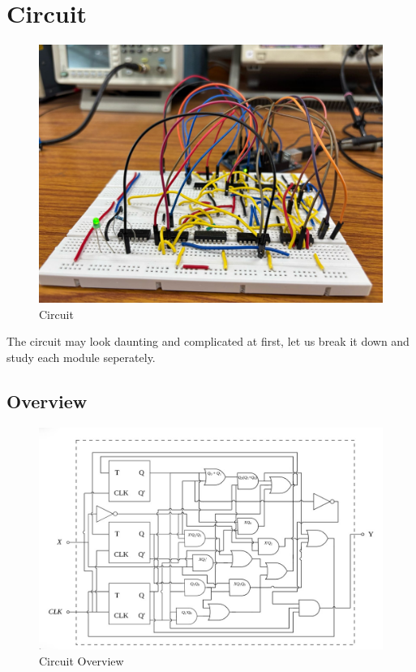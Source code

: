 \documentclass{article}
\begin{document}
\section{Circuit}
\begin{figure}[h!]
    \centering
    \includegraphics[width=0.7\linewidth]{figs/circuit.png}
    \caption{Circuit}
    \label{fig:enter-label}
\end{figure}
The circuit may look daunting and complicated at first, let us break it down and study each module seperately.
\pagebreak
\subsection{Overview}
\begin{figure}[h!]
    \centering
    \includegraphics[width=1\linewidth]{figs/overview.png}
    \caption{Circuit Overview}
    \label{fig:enter-label}
\end{figure}
\end{document}
